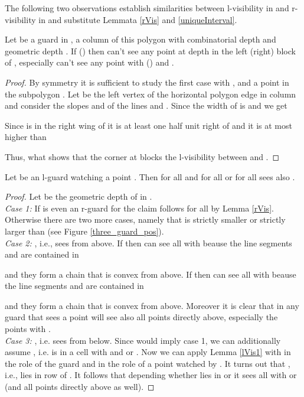 \documentclass[a4paper,USenglish,numberwithinsect]{lipics}
\theoremstyle{plain}
\begin{document}
The following two observations establish  similarities between 
l-visibility in   
and r-visibility in  and substitute Lemmata \ref{rVis} and \ref{uniqueInterval}.
\begin{lemma}
\label{lVis1}
Let  be a guard  in ,  a column
of this polygon with
combinatorial depth  and geometric depth
.
If  ()
then  can't see any point  at depth  in the left (right) block
of , especially  can't see
any point  with  () and .
\end{lemma}
\begin{proof}
By symmetry it is sufficient to study the first case with ,  and
 a point in the subpolygon  .
Let  be the left vertex of the horizontal polygon edge in column  and
consider the  slopes  and  of the lines  and
.
Since the width of  is  and
  we get

Since  is in the right wing of  it is at least one half unit right
of  and it is at most
 higher than 

Thus,  what shows that the corner at  blocks the
l-visibility between  and .
\end{proof}
\begin{lemma}
\label{lVis2}
Let  be an l-guard watching a point .
Then for all  and for all  or for all 
 sees also   .
\end{lemma}
\begin{proof}
Let   be the geometric
depth of   in .
\\
{\em Case 1:} If  is even an r-guard for  the claim follows
for all  
by Lemma \ref{rVis}. Otherwise there are two more cases, namely that
 is strictly smaller or strictly larger than
 (see Figure \ref{three_guard_pos}).
\\
{\em Case 2:} , i.e.,  sees  
from above. If
  then  can see all   with  beause
the line segments  and   are contained in

and they form a chain that is convex from above.
If  then  can see all   with  beause
the line segments  and   are contained in

and they form a chain that is convex from above. Moreover it is clear
that in 
any guard that sees a point   will see also all points directly
above, especially
the points  with .
\\
{\em Case 3:} , i.e.  sees  
from below.  
Since   would imply case 1,
we can additionally
assume  , i.e. 
is in a cell
 with  and  or .
Now we can apply Lemma \ref{lVis1} with  in the role of the
guard 
and  in the role of a point  watched by . It turns out  that
, i.e.,  lies in row  of
.
It follows that depending whether  lies in  or 
it sees all  with  or  (and all
points directly above as well).
\end{proof}
\end{document}
